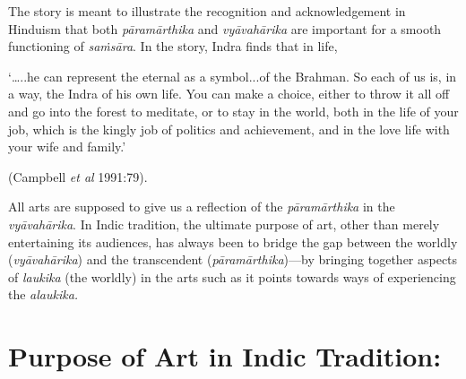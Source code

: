 The story is meant to illustrate the recognition and acknowledgement in Hinduism that both \textsl{pāramārthika} and \textsl{vyāvahārika} are important for a smooth functioning of \textsl{saṁsāra}. In the story, Indra finds that in life, 

\begin{myquote}
‘…..he can represent the eternal as a symbol...of the Brahman. So each of us is, in a way, the Indra of his own life. You can make a choice, either to throw it all off and go into the forest to meditate, or to stay in the world, both in the life of your job, which is the kingly job of politics and achievement, and in the love life with your wife and family.’

\hfill (Campbell \textsl{et al} 1991:79).
\end{myquote}

All arts are supposed to give us a reflection of the \textsl{pāramārthika} in the \textsl{vyāvahārika}. In Indic tradition, the ultimate purpose of art, other than merely entertaining its audiences, has always been to bridge the gap between the worldly (\textsl{vyāvahārika}) and the transcendent (\textsl{pāramārthika})---by bringing together aspects of \textsl{laukika} (the worldly) in the arts such as it points towards ways of experiencing the \textsl{alaukika.}

\section*{Purpose of Art in Indic Tradition:}

